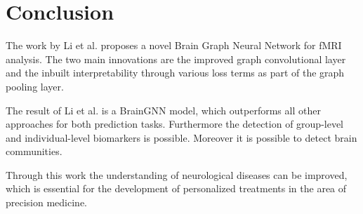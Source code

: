 \section{Conclusion} \label{conclusion}

The work by Li et al. \cite{LI2021102233} proposes a novel Brain Graph Neural Network for fMRI analysis. The two main innovations are the improved graph con\-vo\-lu\-tio\-nal layer and the inbuilt interpretability through various loss terms as part of the graph pooling layer.

The result of Li et al. \cite{LI2021102233} is a BrainGNN model, which outperforms all other approaches for both prediction tasks. Furthermore the detection of group-level and individual-level biomarkers is possible. Moreover it is possible to detect brain communities.

Through this work the understanding of neurological diseases can be improved, which is essential for the development of personalized treatments in the area of precision medicine.